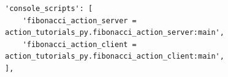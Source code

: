 \documentclass[preview,border=2pt]{standalone}
\begin{document}
\begin{lstlisting}[style=pythonstyle]
'console_scripts': [
    'fibonacci_action_server = action_tutorials_py.fibonacci_action_server:main',
    'fibonacci_action_client = action_tutorials_py.fibonacci_action_client:main',
],
\end{lstlisting}
\end{document}
